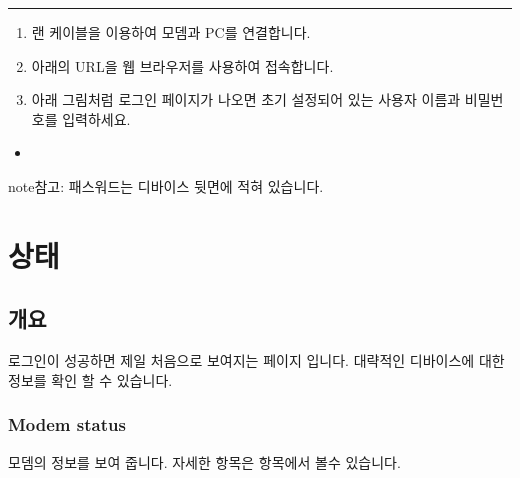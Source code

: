\documentclass[letterpaper,10pt,english]{sphinxmanual}
\begin{document}
\bigskip\hrule\bigskip

\begin{enumerate}
%
\item {} 
\sphinxAtStartPar
랜 케이블을 이용하여 모뎀과 PC를 연결합니다.

\item {} 
\sphinxAtStartPar
아래의 URL을 웹 브라우저를 사용하여 접속합니다.

\item {} 
\sphinxAtStartPar
아래 그림처럼 로그인 페이지가 나오면 초기 설정되어 있는 사용자 이름과 비밀번호를 입력하세요.

\end{enumerate}
\begin{itemize}
\item {} 
\sphinxAtStartPar
{}

\end{itemize}

\noindent{}

\begin{sphinxadmonition}{note}{참고:}
\sphinxAtStartPar
패스워드는 디바이스 뒷면에 적혀 있습니다.
\end{sphinxadmonition}

\sphinxstepscope


\section{상태}
\label{\detokenize{main_menu/status:id1}}\label{\detokenize{main_menu/status::doc}}

\subsection{개요}
\label{\detokenize{main_menu/status:id2}}
\sphinxAtStartPar
로그인이 성공하면 제일 처음으로 보여지는 페이지 입니다. 대략적인 디바이스에 대한 정보를 확인 할 수 있습니다.


\subsubsection{Modem status}
\label{\detokenize{main_menu/status:modem-status}}
\noindent{}

\sphinxAtStartPar
모뎀의 정보를 보여 줍니다. 자세한 항목은  항목에서 볼수 있습니다.
\end{document}
